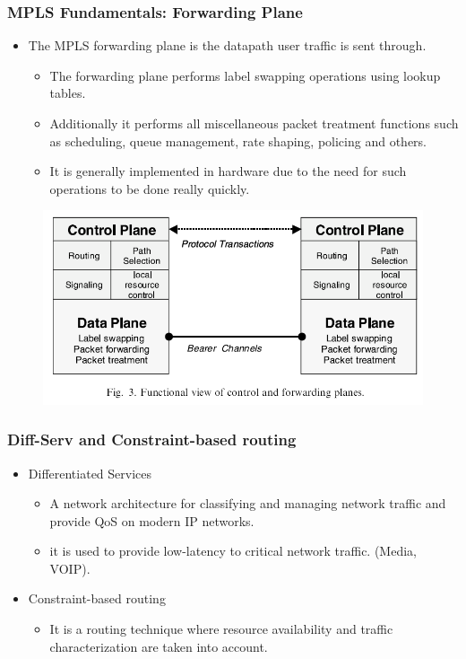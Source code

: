 \documentclass[12pt]{beamer}
\begin{document}
\begin{frame}
	\frametitle{MPLS Fundamentals: Forwarding Plane}
    \begin{itemize}
    \item The MPLS forwarding plane is the datapath user traffic is sent through. 
	    \begin{itemize}
		    \item The forwarding plane performs label swapping operations using lookup tables.
            \item Additionally it performs all miscellaneous packet treatment functions such as scheduling, queue management, rate shaping, policing and others.
		    \item It is generally implemented in hardware due to the need for such operations to be done really quickly.
	    \end{itemize}
    \end{itemize}
	\begin{figure}[h]
		\begin{center}
			\includegraphics[scale=0.35]{label.png}
		\end{center}
	\end{figure}	
\end{frame}

\begin{frame}
	\frametitle{Diff-Serv and Constraint-based routing}
		\begin{itemize}
			\item Differentiated Services
				\begin{itemize}
					\item A network architecture for classifying and managing network traffic and provide QoS on modern IP networks.
					\item it is used to provide low-latency to critical network traffic. (Media, VOIP).
				\end{itemize}
			\item Constraint-based routing
				\begin{itemize}
					\item It is a routing technique where resource availability and traffic characterization are taken into account.
				\end{itemize}
		\end{itemize}

\end{frame}
\end{document}
